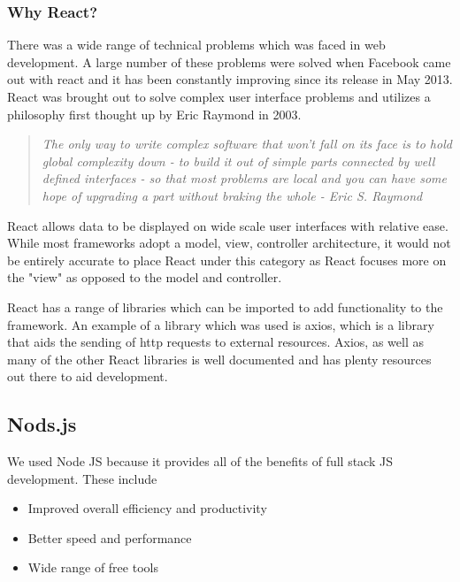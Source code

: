 \subsubsection{Why React?}
There was a wide range of technical problems which was faced in web development. \cite{IntroductionReact}A large number of these problems were solved when Facebook came out with react and it has been constantly improving since its release in May 2013. React was brought out to solve complex user interface problems and utilizes a philosophy first thought up by Eric Raymond in 2003.

\begin{quote}
\cite{ArtOfUnix}\emph{The only way to write complex software that won't fall on its face is to hold global complexity down - to build it out of simple parts connected by well defined interfaces - so that most problems are local and you can have some hope of upgrading a part without braking the whole - Eric S. Raymond}
\end{quote}

\cite{IntroductionReact}React allows data to be displayed on wide scale user interfaces with relative ease. While most frameworks adopt a model, view, controller architecture, it would not be entirely accurate to place React under this category as React focuses more on the "view" as opposed to the model and controller. \par
React has a range of libraries which can be imported to add functionality to the framework.\cite{Axios} An example of a library which was used is axios, which is a library that aids the sending of http requests to external resources. Axios, as well as many of the other React libraries is well documented and has plenty resources out there to aid development.

\subsection{Nods.js}
We used Node JS because it provides all of the benefits of \cite{fullStackJS}full stack JS development. These include

\begin{itemize}
    \item Improved overall efficiency and productivity
    \item Better speed and performance
    \item Wide range of free tools
\end{itemize}

